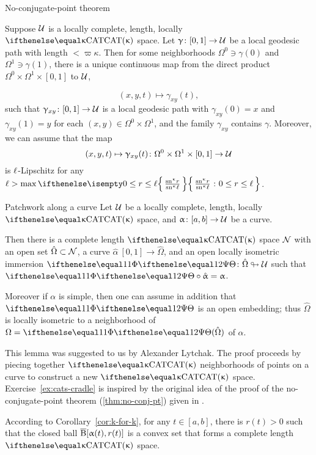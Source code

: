 \begin{thm}{No-conjugate-point theorem}
\label{thm:no-conj-pt}{\sloppy 
Suppose $\mathcal{U}$ is a locally complete, length, locally $\CAT\kappa$ space.
Let $\gamma\:[0,1]\to\spc{U}$ be a local geodesic path with length $<\varpi\kappa$.
Then for some neighborhoods $\Omega^0\ni \gamma(0)$ and $\Omega^1\ni\gamma(1)$, 
there is a unique continuous map from the direct product $\Omega^0\times \Omega^1\times[0,1]$ to $\mathcal{U}$, 

\[(x,y,t)\mapsto\gamma_{x y}(t),\]  
such that 
$\gamma_{x y}\:[0,1]\to\spc{U}$ is a local geodesic path with 
$\gamma_{x y}(0)=x$ and 
$\gamma_{x y}(1)=y$ for each $(x,y)\in\Omega^0\times\Omega^1$,
and the family $\gamma_{x y}$ contains $\gamma$.
Moreover, we can assume that the map 
\[(x,y,t)\mapsto\gamma_{x y}(t)\:\Omega^0\times\Omega^1\times[0,1]\to\spc{U}\] 
is ${\ell}$-Lipschitz
for any
$\Lip>\max\set{\tfrac{\sn\kappa r}{\sn\kappa \ell}}{0\le r\le \ell}$.

}
\end{thm}

\begin{thm}{Patchwork along a curve}
\label{lem:patch}
Let $\mathcal{U}$ be a locally complete, length, locally $\CAT\kappa$ space, 
and $\alpha\:[a,b]\to\spc{U}$ be a curve.

Then there is a complete length $\CAT\kappa$ space $\mathcal{N}$
with an open set $\hat\Omega\subset \spc{N}$,
a curve $\hat\alpha\:[0,1]\to\hat\Omega$,
and an open locally isometric immersion 
 $\map\:\hat\Omega\looparrowright\spc{U}$ such that
$\map\circ\hat\alpha=\alpha$.

Moreover if $\alpha$ is simple, then one can assume in addition that $\map$ is an open embedding;
thus $\hat\Omega$ is locally isometric to a neighborhood of $\Omega=\map(\hat\Omega)$ of $\alpha$.
\end{thm}

This lemma was suggested to us by Alexander Lytchak.
The proof proceeds by piecing together $\CAT{\kappa}$  neighborhoods of points on a curve to construct a new $\CAT{\kappa}$ space.  
Exercise~\ref{ex:cats-cradle} is inspired by the original idea of the proof of the no-conjugate-point theorem (\ref{thm:no-conj-pt}) given in \cite{alexander-bishop:h-c}.

According to Corollary~\ref{cor:k-for-k},
for any $t\in[a,b]$, there is $r(t)>0$ 
such that the closed ball
$\overline{\mathrm{B}}{}[\upalpha(t),r(t)]$ is a  convex set  that forms a complete length $\CAT\kappa$ space.

